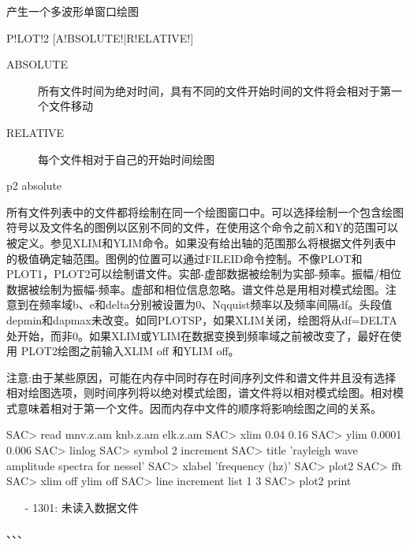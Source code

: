 \label{cmd:plot2}

产生一个多波形单窗口绘图

\begin{SACSTX}
P!LOT!2 [A!BSOLUTE!|R!ELATIVE!]
\end{SACSTX}

\begin{description}
\item [ABSOLUTE] 所有文件时间为绝对时间，具有不同的文件开始时间的文件将会相对于第一个文件移动 
\item [RELATIVE] 每个文件相对于自己的开始时间绘图 
\end{description}

\begin{SACDFT}
p2 absolute
\end{SACDFT}

所有文件列表中的文件都将绘制在同一个绘图窗口中。可以选择绘制一个包含绘图符号以及文件名的图例以区别不同的文件，在使用这个命令之前X和Y的范围可以被定义。参见XLIM和YLIM命令。如果没有给出轴的范围那么将根据文件列表中的极值确定轴范围。图例的位置可以通过FILEID命令控制。不像PLOT和PLOT1，PLOT2可以绘制谱文件。实部-虚部数据被绘制为实部-频率。振幅/相位数据被绘制为振幅-频率。虚部和相位信息忽略。谱文件总是用相对模式绘图。注意到在频率域b、e和delta分别被设置为0、Nqquist频率以及频率间隔df。头段值depmin和dapmax未改变。如同PLOTSP，如果XLIM关闭，绘图将从df=DELTA处开始，而非0。如果XLIM或YLIM在数据变换到频率域之前被改变了，最好在使用	PLOT2绘图之前输入XLIM off 和YLIM off。

注意:由于某些原因，可能在内存中同时存在时间序列文件和谱文件并且没有选择相对绘图选项，则时间序列将以绝对模式绘图，谱文件将以相对模式绘图。相对模式意味着相对于第一个文件。因而内存中文件的顺序将影响绘图之间的关系。

\begin{SACCode}
SAC> read mnv.z.am knb.z.am elk.z.am
SAC> xlim 0.04 0.16
SAC> ylim 0.0001 0.006
SAC> linlog
SAC> symbol 2 increment
SAC> title 'rayleigh wave amplitude spectra for nessel'
SAC> xlabel 'frequency (hz)'
SAC> plot2
SAC> fft
SAC> xlim off ylim off
SAC> line increment list 1 3
SAC> plot2 print
\end{SACCode}

\begin{itemize}
\item[-]1301: 未读入数据文件
\end{itemize}

、、、
